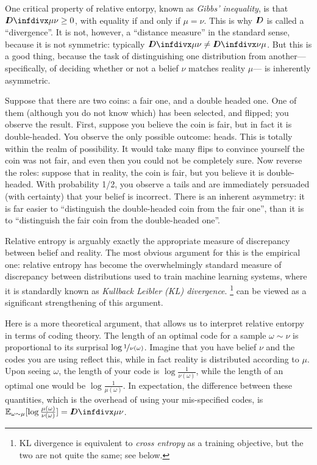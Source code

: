One critical property of relative entorpy, known as \emph{Gibbs' inequality}, is that
$\kldiv{\mu}{\nu} \ge 0$,
with equality if and only if $\mu = \nu$. 
This is why $I\mkern-8muD$ is called a ``divergence''. 
It is not, however, a ``distance measure'' in the standard sense, because it is not symmetric: typically $\kldiv{\mu}{\nu} \ne \kldiv{\nu}{\mu}$. 
%
But this is a good thing, because
the task of distinguishing one distribution from another---%
specifically, of deciding whether or not a belief $\nu$ matches reality $\mu$---%
is inherently asymmetric.

\begin{example}
        \label{ex:coin-unknown-bias}
    Suppose that there are two coins: a fair one, and a double headed one. 
    One of them (although you do not know which) has been selected, and flipped; you observe the result. 
%
    First, suppose you believe the coin is fair, but in fact it is double-headed. 
    You observe the only possible outcome: heads. This is totally within the realm of possibility. It would take many flips to convince yourself the coin was not fair, and even then you could not be completely sure. 
    Now reverse the roles: suppose that in reality, the coin is fair, but you believe it is double-headed. With probability 1/2, you observe a tails and are immediately persuaded (with certainty) that your belief is incorrect. 
%
    There is an inherent asymmetry: it is far easier to ``distinguish the double-headed coin from the fair one'', than it is to ``distinguish the fair coin from the double-headed one''.
\end{example}

Relative entropy is arguably exactly the appropriate measure of discrepancy between belief and reality. 
The most obvious argument for this is the empirical one:
relative entropy has become the overwhelmingly standard measure of discrepancy between distributions used to train machine learning systems, where it is standardly known as \emph{Kullback Leibler (KL) divergence}.%
\footnote{KL divergence is equivalent to \emph{cross entropy} as a training objective, but the two are not quite the same; see below.}
 can be viewed as a significant strengthening of this argument.


Here is a more theoretical argument, that allows us to interpret relative entorpy in terms of coding theory. 
The length of an optimal code for a sample $\omega \sim \nu$ is proportional to its surprisal $\log \nicefrac1{\nu(\omega)}$.
Imagine that you have belief $\nu$ and the codes you are using reflect this, while in fact reality is distributed according to $\mu$.
Upon seeing $\omega$, the length of your code is $\log\frac{1}{\nu(\omega)}$, while the length of an optimal one would be $\log\frac{1}{\mu(\omega)}$. 
In expectation, the difference between these quantities,
    which is the overhead of using your mis-specified codes, is 
     $\Ex_{\omega \sim \mu}[ \log \frac{\mu(\omega)}{\nu(\omega)}] = \kldiv\mu\nu$.


